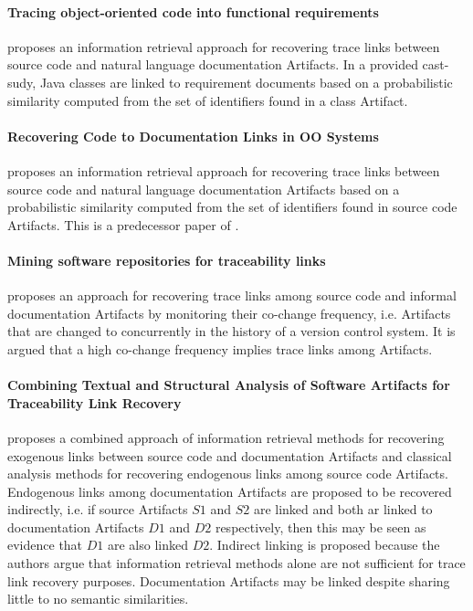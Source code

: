 \paragraph*{Tracing object-oriented code into functional requirements} 
\cite{AntoniolCCDM00}
proposes an information retrieval approach for recovering trace links between source code and natural language documentation \glspl{Artifact}.
In a provided cast-sudy, \gls{Java} classes are linked to requirement documents based on a probabilistic similarity computed from the set of identifiers found in a class \gls{Artifact}.

\paragraph*{Recovering Code to Documentation Links in OO Systems}
\cite{AntoniolCDLM99}
proposes an information retrieval approach for recovering trace links between source code and natural language documentation \glspl{Artifact} based on a  probabilistic similarity computed from the set of identifiers found in source code \glspl{Artifact}.
This is a predecessor paper of \cite{AntoniolCCDM00}.

\paragraph*{Mining software repositories for traceability links}
\cite{KagdiMS07}
proposes an approach for recovering trace links among source code and informal documentation \glspl{Artifact} by monitoring their co-change frequency, i.e. \glspl{Artifact} that are changed to concurrently in the history of a version control system.
It is argued that a high co-change frequency implies trace links among \glspl{Artifact}.


\paragraph*{Combining Textual and Structural Analysis of Software Artifacts for  Traceability Link Recovery}
\cite{McMillanPR2009}
proposes a combined approach of information retrieval methods for recovering exogenous links between source code and documentation \glspl{Artifact} and classical analysis methods for recovering endogenous links among source code \glspl{Artifact}.
Endogenous links among documentation \glspl{Artifact} are proposed to be recovered indirectly, i.e. if source \glspl{Artifact} $S1$ and $S2$ are linked and both ar linked to documentation \glspl{Artifact} $D1$ and $D2$ respectively, then this may be seen as evidence that $D1$ are also linked $D2$.
Indirect linking is proposed because the authors argue that information retrieval methods alone are not sufficient for trace link recovery purposes.
Documentation \glspl{Artifact} may be linked despite sharing little to no semantic similarities.

